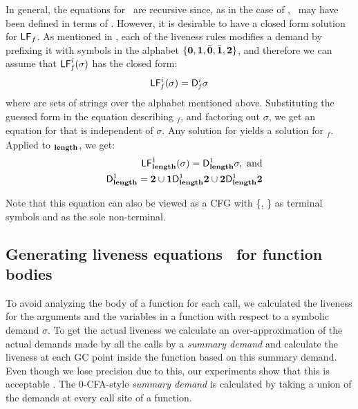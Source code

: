 \documentclass[9pt]{sigplanconf}
\newcommand{\comment}[1]{{\color{Myblue}{(#1)}}}
\begin{document}
In general, the equations for  \Lfonly\ are recursive since, as in the
case  of  \length,  \  may   have  been  defined  in  terms  of
.  However,  it is desirable  to have a  closed form
solution for $\mathsf{LF}_{\mathit \mathit{f}}$.  As mentioned in \cite{asati14lgc},
each  of the liveness  rules modifies  a demand  by prefixing  it with
symbols  in the  alphabet  $\lbrace \mathbf{0},  \mathbf{1},\bar{\mathbf{0}}, \bar{\mathbf{1}},  {\mathbf{2}}
\rbrace$, and therefore we can assume that $\mathsf{LF}_{\mathit f}^{i}( {\mathit \sigma})$ has the
closed form:
\begin{eqnarray}
\label{eq:LF:DI}
  \mathsf{LF}_{\mathit f}^{i}( {\mathit \sigma}) = \mathsf{D}_{\mathit f}^{i}\sigma
\end{eqnarray}
where  are sets of strings over the alphabet mentioned above.
Substituting   the   guessed   form   in   the   equation   describing
\Lfonly$_{\mathit f}$, and factoring  out $\sigma$, we get an equation
for   that  is  independent of  $\sigma$.   Any solution  for
  yields a  solution for  \Lfonly$_{\mathit f}$.   Applied to
\Lfonly$_{\mathit {\mathbf{length}}}$, we get:
  \begin{eqnarray*}
&&  \mathsf{LF}_{\mathit {\mathbf{length}} }^{1}( {\mathit \sigma}) = \mathsf{D}_{\mathit {\mathbf{length}}}^{1}\sigma,~\mbox{and}\\
&&   \mathsf{D}_{\mathit {\mathbf{length}}}^{1} = {\mathbf{2}} \cup \mathbf{1}\mathsf{D}_{\mathit {\mathbf{length}}}^{1}{\mathbf{2}}
       \cup {\mathbf{2}}\mathsf{D}_{\mathit {\mathbf{length}}}^{1}{{\mathbf{2}}}
  \end{eqnarray*}

Note that this equation can also be viewed as a CFG with \{\acdr,
\clazy\} as terminal symbols and  as the sole
non-terminal.

\subsection{Generating liveness equations \Lv\  for function bodies}
\label{sec:bodylivenessbodies}

To avoid analyzing the body of a function for each call, we calculated
the liveness  for the arguments and  the variables in  a function with
respect to a symbolic demand  $\sigma$.  To get the actual liveness we
calculate an over-approximation of the  actual demands made by all the
calls by a {\em summary demand}  and calculate the liveness at each GC
point inside the  function based on this summary  demand.  Even though
we  lose precision  due to  this, our  experiments show  that  this is
acceptable  \comment{Is  this  claim  true?}.   The  0-CFA-style  {\em
  summary demand}  is calculated by taking  a union of  the demands at
every call site of a function.
\end{document}

